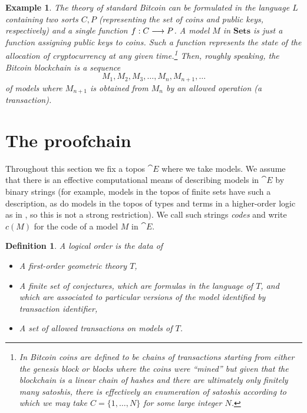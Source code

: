 \documentclass[english,letter paper,12pt,reqno]{article}
\theoremstyle{example}
\newtheorem{definition}[theorem]{Definition}
\newtheorem{example}[theorem]{Example}
\begin{document}
\begin{example} The theory of \emph{standard Bitcoin} can be formulated in the language $L$ containing two sorts $C, P$ (representing the set of coins and public keys, respectively) and a single function $f: C \longrightarrow P$. A model $M$ in $\textbf{Sets}$ is just a function assigning public keys to coins. Such a function represents the state of the allocation of cryptocurrency at any given time.\footnote{In Bitcoin coins are defined to be chains of transactions starting from either the genesis block or blocks where the coins were ``mined'' but given that the blockchain is a linear chain of hashes and there are ultimately only finitely many satoshis, there is effectively an enumeration of satoshis according to which we may take $C = \{1,\ldots,N\}$ for some large integer $N$.} Then, roughly speaking, the Bitcoin blockchain is a sequence
\[
M_1, M_2, M_3, \ldots, M_n, M_{n+1}, \ldots
\]
of models where $M_{n+1}$ is obtained from $M_n$ by an allowed operation (a transaction).

\end{example}

\section{The proofchain}

Throughout this section we fix a topos $\cat{E}$ where we take models. We assume that there is an effective computational means of describing models in $\cat{E}$ by binary strings (for example, models in the topos of finite sets have such a description, as do models in the topos of types and terms in a higher-order logic as in \cite[\S II.1]{lambekscott}, so this is not a strong restriction). We call such strings \emph{codes} and write $c(M)$ for the code of a model $M$ in $\cat{E}$.

\begin{definition} A \emph{logical order} is the data of
\begin{itemize}
\item A first-order geometric theory $T$,
\item A finite set of \emph{conjectures}, which are formulas in the language of $T$, and which are associated to particular versions of the model identified by transaction identifier,
\item A set of \emph{allowed transactions} on models of $T$.
\end{itemize}
\end{definition}
\end{document}
